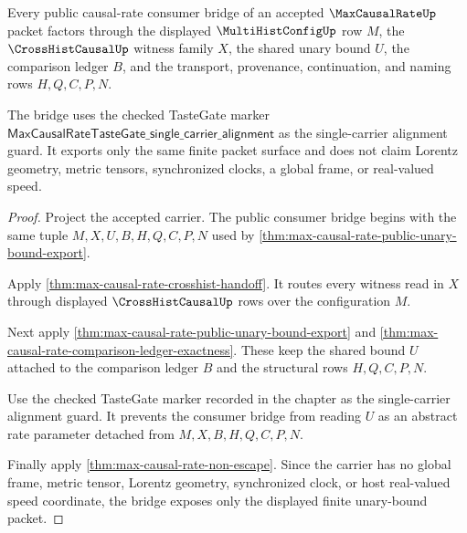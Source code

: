 \begin{theorem}
\label{thm:max-causal-rate-unary-bound-consumer-bridge}
Every public causal-rate consumer bridge of an accepted $\MaxCausalRateUp$ packet factors through the displayed $\MultiHistConfigUp$ row $M$, the $\CrossHistCausalUp$ witness family $X$, the shared unary bound $U$, the comparison ledger $B$, and the transport, provenance, continuation, and naming rows $H,Q,C,P,N$.

The bridge uses the checked TasteGate marker $\mathsf{MaxCausalRateTasteGate\_single\_carrier\_alignment}$ as the single-carrier alignment guard. It exports only the same finite packet surface and does not claim Lorentz geometry, metric tensors, synchronized clocks, a global frame, or real-valued speed.
\end{theorem}
\begin{proof}
Project the accepted carrier. The public consumer bridge begins with the same tuple $M,X,U,B,H,Q,C,P,N$ used by \autoref{thm:max-causal-rate-public-unary-bound-export}.

Apply \autoref{thm:max-causal-rate-crosshist-handoff}. It routes every witness read in $X$ through displayed $\CrossHistCausalUp$ rows over the configuration $M$.

Next apply \autoref{thm:max-causal-rate-public-unary-bound-export} and \autoref{thm:max-causal-rate-comparison-ledger-exactness}. These keep the shared bound $U$ attached to the comparison ledger $B$ and the structural rows $H,Q,C,P,N$.

Use the checked TasteGate marker recorded in the chapter as the single-carrier alignment guard. It prevents the consumer bridge from reading $U$ as an abstract rate parameter detached from $M,X,B,H,Q,C,P,N$.

Finally apply \autoref{thm:max-causal-rate-non-escape}. Since the carrier has no global frame, metric tensor, Lorentz geometry, synchronized clock, or host real-valued speed coordinate, the bridge exposes only the displayed finite unary-bound packet.
\end{proof}

